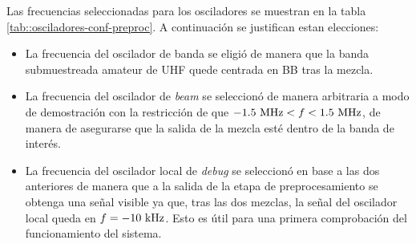\documentclass[../../main.tex]{subfiles}
\begin{document}
Las frecuencias seleccionadas para los osciladores se muestran en la tabla \ref{tab::osciladores-conf-preproc}. A continuación se justifican estan elecciones:
\begin{itemize}
    \item La frecuencia del oscilador de banda se eligió de manera que la banda submuestreada amateur de UHF quede centrada en BB tras la mezcla.
    \item La frecuencia del oscilador de \textit{beam} se seleccionó de manera arbitraria a modo de demostración con la restricción de que $-1.5~\textrm{MHz}<f<1.5~\textrm{MHz}$, de manera de asegurarse que la salida de la mezcla esté dentro de la banda de interés.
    \item La frecuencia del oscilador local de \textit{debug} se seleccionó en base a las dos anteriores de manera que a la salida de la etapa de preprocesamiento se obtenga una señal visible ya que, tras las dos mezclas, la señal del oscilador local queda en $f = -10~\textrm{kHz}$. Esto es útil para una primera comprobación del funcionamiento del sistema.
\end{itemize}


\begin{table}[H]
    \centering
    \caption{Parametros configurados en los osciladores para la etapa de preprocesamiento.}\label{tab::osciladores-conf-preproc} 
    \end{table}
\end{document}
